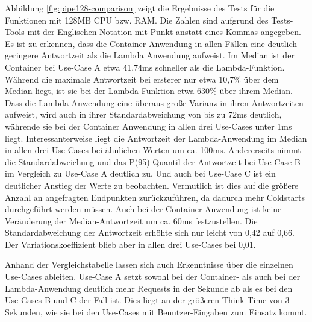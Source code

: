Abbildung \ref{fig:pipe128-comparison} zeigt die Ergebnisse des Tests für die Funktionen mit 128MB CPU bzw. RAM. Die Zahlen sind aufgrund des Tests-Tools mit der Englischen Notation mit Punkt anstatt eines Kommas angegeben. Es ist zu erkennen, dass die Container Anwendung in allen Fällen eine deutlich geringere Antwortzeit als die Lambda Anwendung aufweist. Im Median ist der Container bei Use-Case A etwa 41,74ms schneller als die Lambda-Funktion. Während die maximale Antwortzeit bei ersterer nur etwa 10,7\% über dem Median liegt, ist sie bei der Lambda-Funktion etwa 630\% über ihrem Median. Dass die Lambda-Anwendung eine überaus große Varianz in ihren Antwortzeiten aufweist, wird auch in ihrer Standardabweichung von bis zu 72ms deutlich, währende sie bei der Container Anwendung in allen drei Use-Cases unter 1ms liegt. Interessanterweise liegt die Antwortzeit der Lambda-Anwendung im Median in allen drei Use-Cases bei ähnlichen Werten um ca. 100ms. Andererseits nimmt die Standardabweichung und das P(95) Quantil der Antwortzeit bei Use-Case B im Vergleich zu Use-Case A deutlich zu. Und auch bei Use-Case C ist ein deutlicher Anstieg der Werte zu beobachten. Vermutlich ist dies auf die größere Anzahl an angefragten Endpunkten zurückzuführen, da dadurch mehr Coldstarts durchgeführt werden müssen. Auch bei der Container-Anwendung ist keine Veränderung der Median-Antwortzeit um ca. 60ms festzustellen. Die Standardabweichung der Antwortzeit erhöhte sich nur leicht von 0,42 auf 0,66. Der Variationskoeffizient blieb aber in allen drei Use-Cases bei 0,01.

Anhand der Vergleichstabelle lassen sich auch Erkenntnisse über die einzelnen Use-Cases ableiten. Use-Case A setzt sowohl bei der Container- als auch bei der Lambda-Anwendung deutlich mehr Requests in der Sekunde ab als es bei den Use-Cases B und C der Fall ist. Dies liegt an der größeren Think-Time von 3 Sekunden, wie sie bei den Use-Cases mit Benutzer-Eingaben zum Einsatz kommt.

